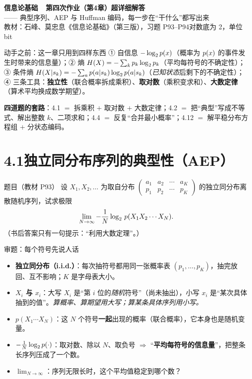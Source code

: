 \documentclass[11pt,a4paper]{ctexart}
\begin{document}
\begin{center}
{\LARGE\bfseries 信息论基础\ \ 第四次作业（第4章）超详细解答}\\[6pt]
{\large —— 典型序列、AEP 与 Huffman 编码，每一步在“干什么”都写出来}\\[6pt]
{\small 教材：石峰、莫忠息《信息论基础》（第三版），习题 P93--P94\quad 对数底为 2，单位 bit}
\end{center}

\begin{idea}{动手之前：这一章只用到四样东西}
① 自信息 $-\log_{2} p\!\left(x\right)$（概率为 $p\!\left(x\right)$ 的事件发生时带来的信息量）；② 熵 $H\!\left(X\right)=-\sum_k p_k\log_{2} p_k$（平均每符号的不确定性）；③ 条件熵 $H\!\left(X|s_k\right)=-\sum_a p\!\left(a|s_k\right)\log_{2} p\!\left(a|s_k\right)$（\emph{已知状态}后剩下的不确定性）；④ 三条工具：\textbf{独立性}（联合概率拆成乘积）、\textbf{取对数}（乘积变求和）、\textbf{大数定律}（算术平均换成数学期望）。

\textbf{四道题的套路}：4.1 $=$ 拆乘积 $+$ 取对数 $+$ 大数定律；4.2 $=$ 把“典型”写成不等式、解出整数 $k$、二项求和；4.4 $=$ 反复“合并最小概率”；4.12 $=$ 解平稳分布方程组 $+$ 分状态编码。
\end{idea}

\section{4.1\quad 独立同分布序列的典型性（AEP）}

\begin{defbox}{题目（教材 P93）}
设 $X_1,X_2,\dots$ 为取自分布
$\begin{pmatrix} a_1 & a_2 & \cdots & a_K\\ p_1 & p_2 & \cdots & p_K\end{pmatrix}$
的独立同分布离散随机序列，试求极限
\[
\lim_{N\to\infty}-\frac1N \log_{2}\, p(X_1X_2\cdots X_N).
\]
（书后答案只有一句提示：“利用大数定理”。）
\end{defbox}

\begin{idea}{审题：每个符号先说人话}
\begin{itemize}[leftmargin=1.3em,itemsep=1pt,topsep=1pt]
  \item \textbf{独立同分布（i.i.d.）}：每次抽符号都用同一张概率表 $(p_1,\dots,p_K)$，抽完放回、互不影响；$K$ 是字母表大小。
  \item \textbf{$X_i$ 与 $x_i$}：大写 $X_i$ 是“第 $i$ 位的\emph{随机}符号”（尚未抽出），小写 $x_i$ 是“某次具体抽到的值”。\emph{算概率、算期望用大写；算某条具体序列用小写。}
  \item \textbf{$p(X_1\cdots X_N)$}：这 $N$ 个符号\textbf{一起}出现的概率（联合概率），它本身也是随机变量。
  \item \textbf{$-\frac1N\log_{2} p(\cdot)$}：取对数、除以 $N$、取负号 $\Rightarrow$ “\textbf{平均每符号的信息量}”，把整条长序列压成了一个数。
  \item \textbf{$\lim_{N\to\infty}$}：序列无限长时，这个平均值稳定到哪个数？
\end{itemize}
\end{idea}
\end{document}
